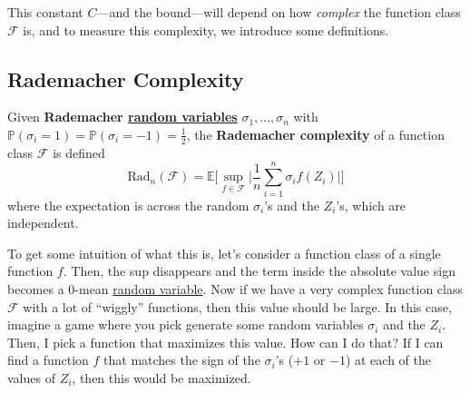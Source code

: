   This constant $C$---and the bound---will depend on how \textit{complex} the function class $\mathcal{F}$ is, and to measure this complexity, we introduce some definitions. 

\subsection{Rademacher Complexity}

  \begin{definition}
    \label{def:rademacher-complexity}
    Given \textbf{Rademacher \hyperref[prob-def:random-variable]{random variables}} $\sigma_1, \ldots, \sigma_n$ with $\mathbb{P}(\sigma_i = 1) = \mathbb{P}(\sigma_i = -1) = \frac{1}{2}$, the \textbf{Rademacher complexity} of a function class $\mathcal{F}$ is defined 
    \begin{equation}
      \mathrm{Rad}_n (\mathcal{F}) = \mathbb{E} \bigg[ \sup_{f \in \mathcal{F}} \bigg| \frac{1}{n} \sum_{i=1}^n \sigma_i f(Z_i) \bigg| \bigg]
    \end{equation}
    where the expectation is across the random $\sigma_i$'s and the $Z_i$'s, which are independent. 
  \end{definition}

  To get some intuition of what this is, let's consider a function class of a single function $f$. Then, the sup disappears and the term inside the absolute value sign becomes a $0$-mean \hyperref[prob-def:random-variable]{random variable}. Now if we have a very complex function class $\mathcal{F}$ with a lot of ``wiggly'' functions, then this value should be large. In this case, imagine a game where you pick generate some random variables $\sigma_i$ and the $Z_i$. Then, I pick a function that maximizes this value. How can I do that? If I can find a function $f$ that matches the sign of the $\sigma_i$'s ($+1$ or $-1$) at each of the values of $Z_i$, then this would be maximized. 

